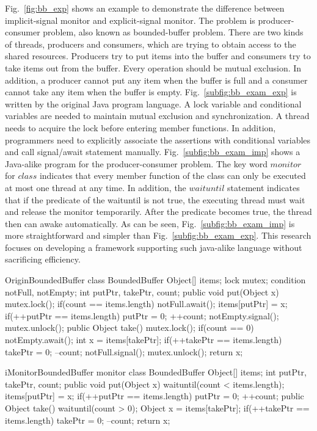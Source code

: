 \documentclass[10pt, conference, compsocconf]{IEEEtran}
\begin{document}
Fig.~\ref{fig:bb_exp} shows an example to
demonstrate the difference between implicit-signal monitor and explicit-signal 
monitor. The problem is producer-consumer problem, also known as bounded-buffer
problem. There are two kinds of threads, producers and consumers, which are 
trying to obtain access to the shared resources. Producers try to put items 
into the buffer and consumers try to take items out from the buffer. Every 
operation should be mutual exclusion. In addition, a producer cannot put any 
item when the buffer is full and a consumer cannot take any item when the 
buffer is empty. Fig.~\ref{subfig:bb_exam_exp} is written by the original Java
program language. A lock variable and conditional variables are
needed to maintain mutual exclusion and synchronization. A thread needs to
acquire the lock before entering member functions. In addition, programmers need
to explicitly associate the assertions with conditional variables and call
signal/await statement manually. Fig.~\ref{subfig:bb_exam_imp} shows a Java-alike
program for the producer-consumer problem. The key word $monitor$ for $class$
indicates that every member function of the class can only be executed at most
one thread at any time. In addition, the $waituntil$ statement indicates that if
the predicate of the waituntil is not true, the executing thread must wait and
release the monitor temporarily. After the predicate becomes true, the thread
then can awake automatically. As can be seen, Fig.~\ref{subfig:bb_exam_imp} is
more straightforward and simpler than Fig.~\ref{subfig:bb_exam_exp}. This research
focuses on developing a framework supporting such java-alike language without 
sacrificing efficiency.


\begin{SaveVerbatim}{OriginBoundedBuffer}
class BoundedBuffer {
  Object[] items;  
  lock mutex;
  condition notFull, notEmpty;
  int putPtr, takePtr, count;
  public void put(Object x) {
    mutex.lock();
    if(count == items.length) {
      notFull.await();
    }
    items[putPtr] = x;
    if(++putPtr == items.length) {
      putPtr = 0;
    }
    ++count;
    notEmpty.signal();
    mutex.unlock();
  }
  public Object take() {
    mutex.lock();
    if(count == 0) {
      notEmpty.await();
    }
    int x = items[takePtr];
    if(++takePtr == items.length) {
      takePtr = 0;
    }
    --count;
    notFull.signal();
    mutex.unlock();
    return x;
  }
}
\end{SaveVerbatim}

\begin{SaveVerbatim}{iMonitorBoundedBuffer}
monitor class BoundedBuffer { 
  Object[] items; 
  int putPtr, takePtr, count; 
  public void put(Object x) { 
    waituntil(count < items.length); 
    items[putPtr] = x; 
    if(++putPtr == items.length) { 
      putPtr = 0; 
    } 
    ++count; 
  } 
  public Object take() { 
    waituntil(count > 0); 
    Object x = items[takePtr]; 
    if(++takePtr == items.length) { 
      takePtr = 0; 
    }
    --count;
    return x;
  }
}
\end{SaveVerbatim}
\end{document}
